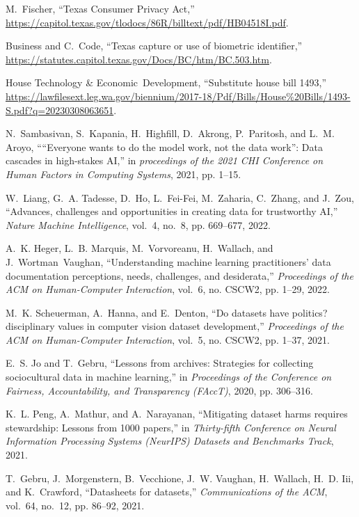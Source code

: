 \documentclass[journal]{IEEEtran}
\begin{document}
\begin{thebibliography}{100}
M.~Fischer, ``Texas Consumer Privacy Act,''
  \url{https://capitol.texas.gov/tlodocs/86R/billtext/pdf/HB04518I.pdf}.

\relax Business and C.~Code, ``Texas capture or use of biometric identifier,''
\url{https://statutes.capitol.texas.gov/Docs/BC/htm/BC.503.htm}.

\relax House Technology \& Economic~Development, ``Substitute house bill
  1493,''
  \url{https://lawfilesext.leg.wa.gov/biennium/2017-18/Pdf/Bills/House\%20Bills/1493-S.pdf?q=20230308063651}.

N.~Sambasivan, S.~Kapania, H.~Highfill, D.~Akrong, P.~Paritosh, and L.~M.
  Aroyo, ``“Everyone wants to do the model work, not the data work”: Data
  cascades in high-stakes AI,'' in \emph{proceedings of the 2021 CHI Conference
  on Human Factors in Computing Systems}, 2021, pp. 1--15.

W.~Liang, G.~A. Tadesse, D.~Ho, L.~Fei-Fei, M.~Zaharia, C.~Zhang, and J.~Zou,
  ``Advances, challenges and opportunities in creating data for trustworthy
  AI,'' \emph{Nature Machine Intelligence}, vol.~4, no.~8, pp. 669--677, 2022.

A.~K. Heger, L.~B. Marquis, M.~Vorvoreanu, H.~Wallach, and J.~Wortman~Vaughan,
  ``Understanding machine learning practitioners' data documentation
  perceptions, needs, challenges, and desiderata,'' \emph{Proceedings of the
  ACM on Human-Computer Interaction}, vol.~6, no. CSCW2, pp. 1--29, 2022.

M.~K. Scheuerman, A.~Hanna, and E.~Denton, ``Do datasets have politics?
  disciplinary values in computer vision dataset development,''
  \emph{Proceedings of the ACM on Human-Computer Interaction}, vol.~5, no.
  CSCW2, pp. 1--37, 2021.

E.~S. Jo and T.~Gebru, ``Lessons from archives: Strategies for collecting
  sociocultural data in machine learning,'' in \emph{Proceedings of the
  Conference on Fairness, Accountability, and Transparency (FAccT)}, 2020, pp.
  306--316.

K.~L. Peng, A.~Mathur, and A.~Narayanan, ``Mitigating dataset harms requires
  stewardship: Lessons from 1000 papers,'' in \emph{Thirty-fifth Conference on
  Neural Information Processing Systems (NeurIPS) Datasets and Benchmarks Track}, 2021. 

T.~Gebru, J.~Morgenstern, B.~Vecchione, J.~W. Vaughan, H.~Wallach, H.~D. Iii,
  and K.~Crawford, ``Datasheets for datasets,'' \emph{Communications of the
  ACM}, vol.~64, no.~12, pp. 86--92, 2021.


\end{thebibliography}
\end{document}
